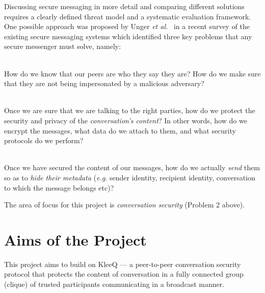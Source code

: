 \documentclass[a4paper, 12pt]{report}
\begin{document}
Discussing secure messaging in more detail and comparing different solutions requires a clearly defined threat model and a systematic evaluation framework. One possible approach was proposed by Unger \textit{et al.}~\cite{unger2015sok} in a recent survey of the existing secure messaging systems which identified three key problems that any secure messenger must solve, namely:


\begin{description}[labelindent=0.5cm, leftmargin=1.3cm, rightmargin=0.5cm]
    \item[Problem 1: Trust Establishment]\hfill \\
        How do we know that our peers are who they say they are? How do we make sure that they are not being impersonated by a malicious adversary?
    \item[Problem 2: Conversation Security]\hfill \\
        Once we are sure that we are talking to the right parties, how do we protect the security and privacy of the \emph{conversation's content}? In other words, how do we encrypt the messages, what data do we attach to them, and what security protocols do we perform?
    \item[Problem 3: Transport Privacy]\hfill \\
        Once we have secured the content of our messages, how do we actually \emph{send} them so as to \emph{hide their metadata} (\textit{e.g.} sender identity, recipient identity, conversation to which the message belongs etc)?
\end{description}
The area of focus for this project is \emph{conversation security} (Problem 2 above).

\section{Aims of the Project}
\label{sec:intro.aims}
This project aims to build on KleeQ \cite{reardon2007kleeq} --- a peer-to-peer conversation security protocol that protects the content of conversation in a fully connected group (clique) of trusted participants communicating in a broadcast manner. \\
\end{document}
